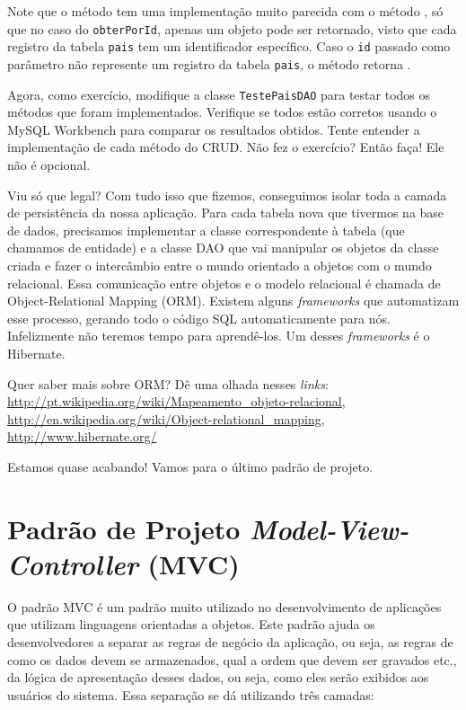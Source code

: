 Note que o método  tem uma implementação muito parecida com o método , só que no caso do \texttt{obterPorId}, apenas um objeto pode ser retornado, visto que cada registro da tabela \texttt{pais} tem um identificador específico. Caso o \texttt{id} passado como parâmetro não represente um registro da tabela \texttt{pais}, o método retorna .

Agora, como exercício, modifique a classe \texttt{TestePaisDAO} para testar todos os métodos que foram implementados. Verifique se todos estão corretos usando o MySQL Workbench para comparar os resultados obtidos. Tente entender a implementação de cada método do CRUD. Não fez o exercício? Então faça! Ele não é opcional.

Viu só que legal? Com tudo isso que fizemos, conseguimos isolar toda a camada de persistência da nossa aplicação. Para cada tabela nova que tivermos na base de dados, precisamos implementar a classe correspondente à tabela (que chamamos de entidade) e a classe DAO que vai manipular os objetos da classe criada e fazer o intercâmbio entre o mundo orientado a objetos com o mundo relacional. Essa comunicação entre objetos e o modelo relacional é chamada de Object-Relational Mapping (ORM). Existem alguns \textit{frameworks} que automatizam esse processo, gerando todo o código SQL automaticamente para nós. Infelizmente não teremos tempo para aprendê-los. Um desses \textit{frameworks} é o Hibernate.

\begin{saibaMais}
    Quer saber mais sobre ORM? Dê uma olhada nesses \textit{links}: \url{http://pt.wikipedia.org/wiki/Mapeamento_objeto-relacional}, \url{http://en.wikipedia.org/wiki/Object-relational_mapping}, \url{http://www.hibernate.org/}
\end{saibaMais}

Estamos quase acabando! Vamos para o último padrão de projeto.


\section{Padrão de Projeto \textit{Model-View-Controller} (MVC)}


O padrão MVC é um padrão muito utilizado no desenvolvimento de aplicações que utilizam linguagens orientadas a objetos. Este padrão ajuda os desenvolvedores a separar as regras de negócio da aplicação, ou seja, as regras de como os dados devem se armazenados, qual a ordem que devem ser gravados etc., da lógica de apresentação desses dados, ou seja, como eles serão exibidos aos usuários do sistema. Essa separação se dá utilizando três camadas: 

